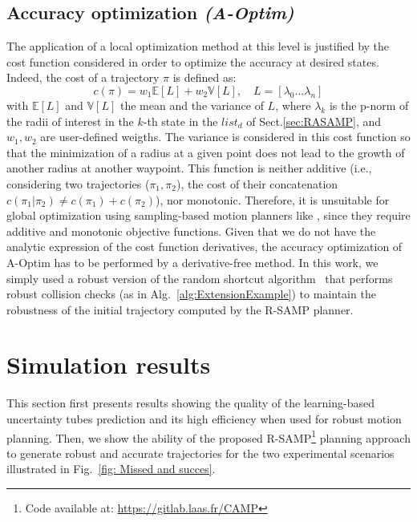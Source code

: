\subsection{Accuracy optimization \emph{(A-Optim)} }\label{sec:AOptim}

The application of a local optimization method at this level is justified by the cost function considered in order to optimize the accuracy at desired states. 
Indeed, the cost of a trajectory $\pi$ is defined as:
\begin{equation}\label{eq: cost}
    c(\pi) = w_1\mathbb{E}[L] + w_2\mathbb{V}[L], \quad L = \left[\lambda_{0} ... \lambda_n \right]
\end{equation}
with $\mathbb{E}[L]$ and $\mathbb{V}[L]$ the mean and the variance of $L$, where $\lambda_k$ is the p-norm of the radii of interest in the $k$-th state in the $list_{d}$ of Sect.\ref{sec:RASAMP}, and $w_1, w_2$ are user-defined weigths.
The variance is considered in this cost function so that the minimization of a radius at a given point does not lead to the growth of another radius at another waypoint.
This function is neither additive (i.e., considering two trajectories ($\pi_{1}, \pi_{2}$), the cost of their concatenation $c(\pi_{1}|\pi_{2}) \neq c(\pi_{1}) + c(\pi_{2})$), nor monotonic. Therefore, it is unsuitable for global optimization using sampling-based motion planners like \cite{cRRT,cRRTstar}, since they require additive and monotonic objective functions.
Given that we do not have the analytic expression of the cost function derivatives, the accuracy optimization of A-Optim has to be performed by a derivative-free method. In this work, we simply used a robust version of the random shortcut algorithm~\cite{cShortcut} that performs robust collision checks (as in Alg.~\ref{alg:ExtensionExample}) to maintain the robustness of the initial trajectory computed by the R-SAMP planner.


\section{Simulation results} \label{sec:Simu Results}

This section first presents results showing the quality of the learning-based uncertainty tubes prediction and its high efficiency when used for robust motion planning. 
Then, we show the ability of the proposed R-SAMP\footnote{Code available at: \href{https://gitlab.laas.fr/CAMP}{https://gitlab.laas.fr/CAMP}} planning approach to generate robust 
and accurate trajectories for the two experimental scenarios illustrated in Fig.~\ref{fig: Missed and succes}.

